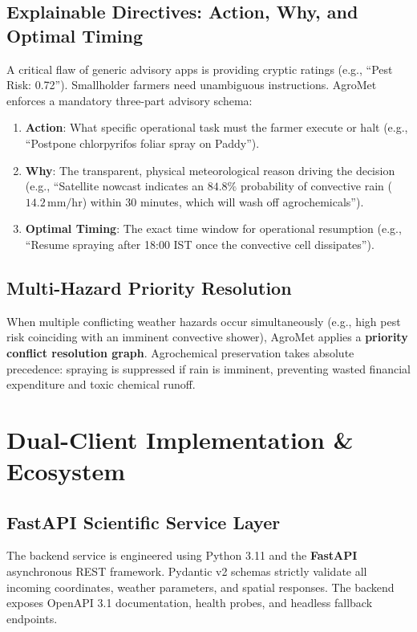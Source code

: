 \documentclass[11pt,a4paper,oneside]{report}
\begin{document}
\section{Explainable Directives: Action, Why, and Optimal Timing}
A critical flaw of generic advisory apps is providing cryptic ratings (e.g., ``Pest Risk: 0.72''). Smallholder farmers need unambiguous instructions. AgroMet enforces a mandatory three-part advisory schema:
\begin{enumerate}[leftmargin=*]
    \item \textbf{Action}: What specific operational task must the farmer execute or halt (e.g., ``Postpone chlorpyrifos foliar spray on Paddy'').
    \item \textbf{Why}: The transparent, physical meteorological reason driving the decision (e.g., ``Satellite nowcast indicates an $84.8\%$ probability of convective rain ($14.2\,\text{mm/hr}$) within 30 minutes, which will wash off agrochemicals'').
    \item \textbf{Optimal Timing}: The exact time window for operational resumption (e.g., ``Resume spraying after 18:00 IST once the convective cell dissipates'').
\end{enumerate}

\section{Multi-Hazard Priority Resolution}
When multiple conflicting weather hazards occur simultaneously (e.g., high pest risk coinciding with an imminent convective shower), AgroMet applies a \textbf{priority conflict resolution graph}. Agrochemical preservation takes absolute precedence: spraying is suppressed if rain is imminent, preventing wasted financial expenditure and toxic chemical runoff.

\chapter{Dual-Client Implementation \& Ecosystem}

\section{FastAPI Scientific Service Layer}
The backend service is engineered using Python 3.11 and the \textbf{FastAPI} asynchronous REST framework. Pydantic v2 schemas strictly validate all incoming coordinates, weather parameters, and spatial responses. The backend exposes OpenAPI 3.1 documentation, health probes, and headless fallback endpoints.
\end{document}
